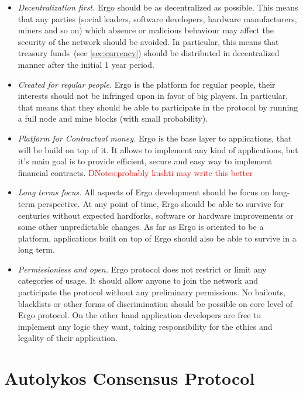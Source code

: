 \documentclass[]{article}
\newcommand{\dnote}[1]{{\textcolor{red}{DNotes:{#1}}}}
\newcommand{\Ergo}{Ergo}
\begin{document}
    \begin{itemize}
        \item{\em Decentralization first.} \Ergo{} should be as decentralized as possible.
        This means that any parties (social leaders, software developers, hardware manufacturers, miners and so on)
        which absence or malicious behaviour may affect the security of the network should be avoided.
        In particular, this means that treasury funds~(see \ref{sec:currency}) should be distributed
        in decentralized manner after the initial 1 year period.
        \item{\em Created for regular people.} \Ergo{} is the platform for regular people, their interests should
        not be infringed upon in favor of big players. In particular, that means that they should be able to
        participate in the protocol by running a full node and mine blocks (with small probability).
        \item{\em Platform for Contractual money.} \Ergo{} is the base layer to applications, that will be
        build on top of it. It allows to implement any kind of applications, but it's main goal is
        to provide efficient, secure and easy way to implement financial contracts. \dnote{probably kushti may write this better}
        \item{\em Long terms focus.} All aspects of \Ergo{} development should be focus on long-term perspective.
        At any point of time, \Ergo{} should be able to survive for centuries without expected hardforks,
        software or hardware improvements or some other unpredictable changes. As far as \Ergo{} is oriented
        to be a platform, applications built on top of \Ergo{} should also be able to survive in a long term.
        \item{\em Permissionless and open.} \Ergo{} protocol does not restrict or limit any categories of usage.
        It should allow anyone to join the network and participate the protocol without any preliminary permissions.
        No bailouts, blacklists or other forms of discrimination should be possible on core level of \Ergo{} protocol.
        On the other hand application developers are free to implement any logic they want, taking responsibility
        for the ethics and legality of their application.
    \end{itemize}


    \section{Autolykos Consensus Protocol}
    \label{sec:autolykos}
\end{document}
